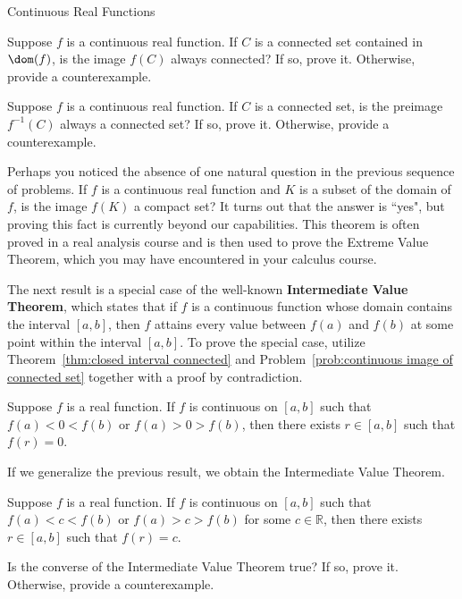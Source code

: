 \begin{section}{Continuous Real Functions}


\begin{problem}\label{prob:continuous image of connected set}
Suppose $f$ is a continuous real function. If $C$ is a connected set contained in $\dom(f)$, is the image $f(C)$ always connected?  If so, prove it.  Otherwise, provide a counterexample.
\end{problem}

\begin{problem}
Suppose $f$ is a continuous real function. If $C$ is a connected set, is the preimage $f^{-1}(C)$ always a connected set? If so, prove it.  Otherwise, provide a counterexample.
\end{problem}

Perhaps you noticed the absence of one natural question in the previous sequence of problems. If $f$ is a continuous real function and $K$ is a subset of the domain of $f$, is the image $f(K)$ a compact set?  It turns out that the answer is ``yes", but proving this fact is currently beyond our capabilities. This theorem is often proved in a real analysis course and is then used to prove the Extreme Value Theorem, which you may have encountered in your calculus course.

The next result is a special case of the well-known \textbf{Intermediate Value Theorem}, which states that if $f$ is a continuous function whose domain contains the interval $[a,b]$, then $f$ attains every value between $f(a)$ and $f(b)$ at some point within the interval $[a,b]$. To prove the special case, utilize Theorem~\ref{thm:closed interval connected} and Problem~\ref{prob:continuous image of connected set} together with a proof by contradiction.

\begin{theorem}
Suppose $f$ is a real function. If $f$ is continuous on $[a,b]$ such that $f(a)<0<f(b)$ or $f(a)>0>f(b)$, then there exists $r\in [a,b]$ such that $f(r)=0$.
\end{theorem}

If we generalize the previous result, we obtain the Intermediate Value Theorem.

\begin{theorem}
Suppose $f$ is a real function. If $f$ is continuous on $[a,b]$ such that $f(a)<c<f(b)$ or $f(a)>c>f(b)$ for some $c\in \mathbb{R}$, then there exists $r\in [a,b]$ such that $f(r)=c$.
\end{theorem}

\begin{problem}
Is the converse of the Intermediate Value Theorem true? If so, prove it.  Otherwise, provide a counterexample.
\end{problem}

\end{section}